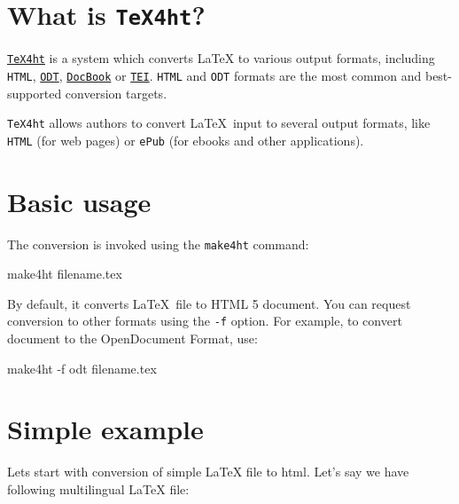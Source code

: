 \hypertarget{what-is-tex4ht}{%
\section{\texorpdfstring{What is
\texttt{TeX4ht}?}{What is TeX4ht?}}\label{what-is-tex4ht}}

\href{https://www.tug.org/tex4ht/}{\texttt{TeX4ht}} is a system which
converts LaTeX to various output formats, including \texttt{HTML},
\href{http://en.wikipedia.org/wiki/OpenDocument}{\texttt{ODT}},
\href{http://en.wikipedia.org/wiki/DocBook}{\texttt{DocBook}} or
\href{http://en.wikipedia.org/wiki/Text_Encoding_Initiative}{\texttt{TEI}}.
\texttt{HTML} and \texttt{ODT} formats are the most common and best-supported
conversion targets.

\texttt{TeX4ht} allows authors to convert \LaTeX\ input to 
several output formats, like  \texttt{HTML} (for web pages) or
\texttt{ePub} (for ebooks and other applications).

\hypertarget{basic-usage}{%
\section{Basic usage}\label{basic-usage}}

The conversion is invoked using the \texttt{make4ht} command:

\begin{shellcommand}
make4ht filename.tex
\end{shellcommand}

By default, it converts \LaTeX\ file to HTML 5 document. You can request
conversion to other formats using the \texttt{-f} option. For example,
to convert document to the OpenDocument Format, use:

\begin{shellcommand}
make4ht -f odt filename.tex
\end{shellcommand}


\hypertarget{simple-example}{%
\section{Simple example}\label{simple-example}}

Lets start with conversion of simple LaTeX file to html. Let's say we
have following multilingual LaTeX file:



